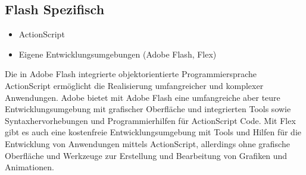 \subsection{Flash Spezifisch}
\begin{itemize}
	\item{ActionScript}
	\item{Eigene Entwicklungsumgebungen (Adobe Flash, Flex)}
\end{itemize}
Die in Adobe Flash integrierte objektorientierte Programmiersprache
ActionScript ermöglicht die Realisierung umfangreicher und komplexer
Anwendungen. Adobe bietet mit Adobe Flash eine umfangreiche aber teure
Entwicklungsumgebung mit grafischer Oberfläche und integrierten Tools sowie
Syntaxhervorhebungen und Programmierhilfen für ActionScript Code.
Mit Flex gibt es auch eine kostenfreie Entwicklungsumgebung mit Tools und
Hilfen für die Entwicklung von Anwendungen mittels ActionScript, allerdings
ohne grafische Oberfläche und Werkzeuge zur Erstellung und Bearbeitung
von Grafiken und Animationen.

